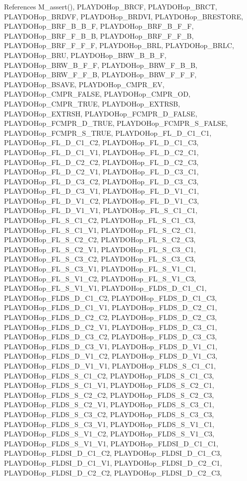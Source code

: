 References M\_\-assert(), PLAYDOHop\_\-BRCF, PLAYDOHop\_\-BRCT, PLAYDOHop\_\-BRDVF, PLAYDOHop\_\-BRDVI, PLAYDOHop\_\-BRESTORE, PLAYDOHop\_\-BRF\_\-B\_\-B\_\-F, PLAYDOHop\_\-BRF\_\-B\_\-F\_\-F, PLAYDOHop\_\-BRF\_\-F\_\-B\_\-B, PLAYDOHop\_\-BRF\_\-F\_\-F\_\-B, PLAYDOHop\_\-BRF\_\-F\_\-F\_\-F, PLAYDOHop\_\-BRL, PLAYDOHop\_\-BRLC, PLAYDOHop\_\-BRU, PLAYDOHop\_\-BRW\_\-B\_\-B\_\-F, PLAYDOHop\_\-BRW\_\-B\_\-F\_\-F, PLAYDOHop\_\-BRW\_\-F\_\-B\_\-B, PLAYDOHop\_\-BRW\_\-F\_\-F\_\-B, PLAYDOHop\_\-BRW\_\-F\_\-F\_\-F, PLAYDOHop\_\-BSAVE, PLAYDOHop\_\-CMPR\_\-EV, PLAYDOHop\_\-CMPR\_\-FALSE, PLAYDOHop\_\-CMPR\_\-OD, PLAYDOHop\_\-CMPR\_\-TRUE, PLAYDOHop\_\-EXTRSB, PLAYDOHop\_\-EXTRSH, PLAYDOHop\_\-FCMPR\_\-D\_\-FALSE, PLAYDOHop\_\-FCMPR\_\-D\_\-TRUE, PLAYDOHop\_\-FCMPR\_\-S\_\-FALSE, PLAYDOHop\_\-FCMPR\_\-S\_\-TRUE, PLAYDOHop\_\-FL\_\-D\_\-C1\_\-C1, PLAYDOHop\_\-FL\_\-D\_\-C1\_\-C2, PLAYDOHop\_\-FL\_\-D\_\-C1\_\-C3, PLAYDOHop\_\-FL\_\-D\_\-C1\_\-V1, PLAYDOHop\_\-FL\_\-D\_\-C2\_\-C1, PLAYDOHop\_\-FL\_\-D\_\-C2\_\-C2, PLAYDOHop\_\-FL\_\-D\_\-C2\_\-C3, PLAYDOHop\_\-FL\_\-D\_\-C2\_\-V1, PLAYDOHop\_\-FL\_\-D\_\-C3\_\-C1, PLAYDOHop\_\-FL\_\-D\_\-C3\_\-C2, PLAYDOHop\_\-FL\_\-D\_\-C3\_\-C3, PLAYDOHop\_\-FL\_\-D\_\-C3\_\-V1, PLAYDOHop\_\-FL\_\-D\_\-V1\_\-C1, PLAYDOHop\_\-FL\_\-D\_\-V1\_\-C2, PLAYDOHop\_\-FL\_\-D\_\-V1\_\-C3, PLAYDOHop\_\-FL\_\-D\_\-V1\_\-V1, PLAYDOHop\_\-FL\_\-S\_\-C1\_\-C1, PLAYDOHop\_\-FL\_\-S\_\-C1\_\-C2, PLAYDOHop\_\-FL\_\-S\_\-C1\_\-C3, PLAYDOHop\_\-FL\_\-S\_\-C1\_\-V1, PLAYDOHop\_\-FL\_\-S\_\-C2\_\-C1, PLAYDOHop\_\-FL\_\-S\_\-C2\_\-C2, PLAYDOHop\_\-FL\_\-S\_\-C2\_\-C3, PLAYDOHop\_\-FL\_\-S\_\-C2\_\-V1, PLAYDOHop\_\-FL\_\-S\_\-C3\_\-C1, PLAYDOHop\_\-FL\_\-S\_\-C3\_\-C2, PLAYDOHop\_\-FL\_\-S\_\-C3\_\-C3, PLAYDOHop\_\-FL\_\-S\_\-C3\_\-V1, PLAYDOHop\_\-FL\_\-S\_\-V1\_\-C1, PLAYDOHop\_\-FL\_\-S\_\-V1\_\-C2, PLAYDOHop\_\-FL\_\-S\_\-V1\_\-C3, PLAYDOHop\_\-FL\_\-S\_\-V1\_\-V1, PLAYDOHop\_\-FLDS\_\-D\_\-C1\_\-C1, PLAYDOHop\_\-FLDS\_\-D\_\-C1\_\-C2, PLAYDOHop\_\-FLDS\_\-D\_\-C1\_\-C3, PLAYDOHop\_\-FLDS\_\-D\_\-C1\_\-V1, PLAYDOHop\_\-FLDS\_\-D\_\-C2\_\-C1, PLAYDOHop\_\-FLDS\_\-D\_\-C2\_\-C2, PLAYDOHop\_\-FLDS\_\-D\_\-C2\_\-C3, PLAYDOHop\_\-FLDS\_\-D\_\-C2\_\-V1, PLAYDOHop\_\-FLDS\_\-D\_\-C3\_\-C1, PLAYDOHop\_\-FLDS\_\-D\_\-C3\_\-C2, PLAYDOHop\_\-FLDS\_\-D\_\-C3\_\-C3, PLAYDOHop\_\-FLDS\_\-D\_\-C3\_\-V1, PLAYDOHop\_\-FLDS\_\-D\_\-V1\_\-C1, PLAYDOHop\_\-FLDS\_\-D\_\-V1\_\-C2, PLAYDOHop\_\-FLDS\_\-D\_\-V1\_\-C3, PLAYDOHop\_\-FLDS\_\-D\_\-V1\_\-V1, PLAYDOHop\_\-FLDS\_\-S\_\-C1\_\-C1, PLAYDOHop\_\-FLDS\_\-S\_\-C1\_\-C2, PLAYDOHop\_\-FLDS\_\-S\_\-C1\_\-C3, PLAYDOHop\_\-FLDS\_\-S\_\-C1\_\-V1, PLAYDOHop\_\-FLDS\_\-S\_\-C2\_\-C1, PLAYDOHop\_\-FLDS\_\-S\_\-C2\_\-C2, PLAYDOHop\_\-FLDS\_\-S\_\-C2\_\-C3, PLAYDOHop\_\-FLDS\_\-S\_\-C2\_\-V1, PLAYDOHop\_\-FLDS\_\-S\_\-C3\_\-C1, PLAYDOHop\_\-FLDS\_\-S\_\-C3\_\-C2, PLAYDOHop\_\-FLDS\_\-S\_\-C3\_\-C3, PLAYDOHop\_\-FLDS\_\-S\_\-C3\_\-V1, PLAYDOHop\_\-FLDS\_\-S\_\-V1\_\-C1, PLAYDOHop\_\-FLDS\_\-S\_\-V1\_\-C2, PLAYDOHop\_\-FLDS\_\-S\_\-V1\_\-C3, PLAYDOHop\_\-FLDS\_\-S\_\-V1\_\-V1, PLAYDOHop\_\-FLDSI\_\-D\_\-C1\_\-C1, PLAYDOHop\_\-FLDSI\_\-D\_\-C1\_\-C2, PLAYDOHop\_\-FLDSI\_\-D\_\-C1\_\-C3, PLAYDOHop\_\-FLDSI\_\-D\_\-C1\_\-V1, PLAYDOHop\_\-FLDSI\_\-D\_\-C2\_\-C1, PLAYDOHop\_\-FLDSI\_\-D\_\-C2\_\-C2, PLAYDOHop\_\-FLDSI\_\-D\_\-C2\_\-C3, 